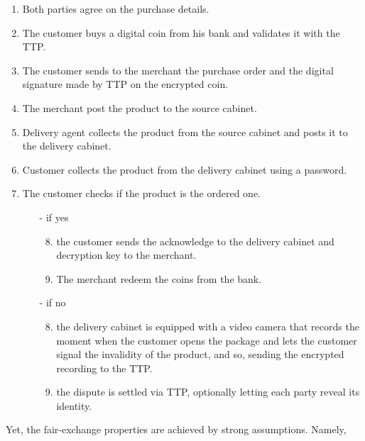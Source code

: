 \documentclass{ieeeaccess}
\begin{document}
\begin{enumerate}
    \item Both parties agree on the purchase details.
    \item The customer buys a digital coin from his bank and validates it with the TTP.
    \item The customer sends to the merchant the purchase order and the digital signature made by TTP on the encrypted coin.
    \item The merchant post the product to the source cabinet.
    \item Delivery agent collects the product from the source cabinet and posts it to the delivery cabinet.
    \item Customer collects the product from the delivery cabinet using a password.
    \item The customer checks if the product is the ordered one.
    \begin{itemize}
    \item[-] if yes 
        \begin{enumerate}
        \setcounter{enumii}{7}
        \item the customer sends the acknowledge to the delivery cabinet and decryption key to the merchant.
        \item The merchant redeem the coins from the bank.
        \end{enumerate}
    \item[-] if no
        \begin{enumerate}
        \setcounter{enumii}{7}
        \item the delivery cabinet is equipped with a video camera that records the moment when the customer opens the package and lets the customer signal the invalidity of the product, and so, sending the encrypted recording to the TTP. 
        \item the dispute is settled via TTP, optionally letting each party reveal its identity.
    \end{enumerate}
    \end{itemize}
\end{enumerate}
\endgroup

Yet, the fair-exchange properties are achieved by strong assumptions.
Namely,
\end{document}

